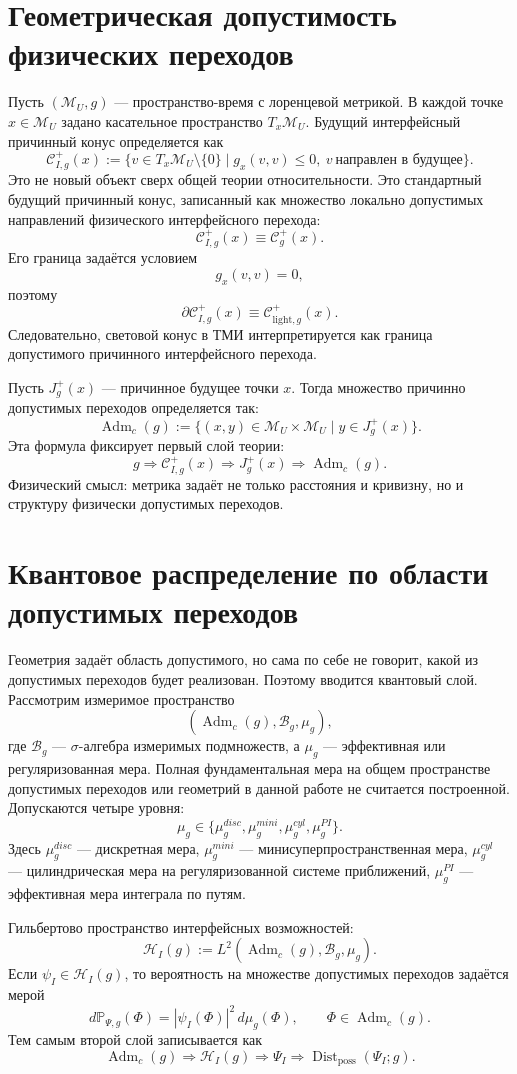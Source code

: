 \documentclass[12pt,a4paper]{article}
\DeclareMathOperator{\Adm}{Adm}
\DeclareMathOperator{\Dist}{Dist}
\newcommand{\M}{\mathcal M_U}
\newcommand{\Hilb}{\mathcal H}
\newcommand{\Prob}{\mathbb P}
\begin{document}
\section{Геометрическая допустимость физических переходов}
Пусть $(\M,g)$ — пространство-время с лоренцевой метрикой. В каждой точке $x\in\M$ задано касательное пространство $T_x\M$. Будущий интерфейсный причинный конус определяется как
\[
\boxed{
\mathcal C^{+}_{I,g}(x):=
\{v\in T_x\M\setminus\{0\}\mid g_x(v,v)\leq0,\ v\ \text{направлен в будущее}\}.
}
\]
Это не новый объект сверх общей теории относительности. Это стандартный будущий причинный конус, записанный как множество локально допустимых направлений физического интерфейсного перехода:
\[
\boxed{\mathcal C^{+}_{I,g}(x)\equiv\mathcal C^{+}_{g}(x).}
\]
Его граница задаётся условием
\[
 g_x(v,v)=0,
\]
поэтому
\[
\boxed{\partial\mathcal C^{+}_{I,g}(x)\equiv\mathcal C^{+}_{\mathrm{light},g}(x).}
\]
Следовательно, световой конус в ТМИ интерпретируется как граница допустимого причинного интерфейсного перехода.

Пусть $J_g^+(x)$ — причинное будущее точки $x$. Тогда множество причинно допустимых переходов определяется так:
\[
\boxed{
\Adm_c(g):=\{(x,y)\in\M\times\M\mid y\in J_g^+(x)\}.
}
\]
Эта формула фиксирует первый слой теории:
\[
\boxed{g\Rightarrow\mathcal C^+_{I,g}(x)\Rightarrow J_g^+(x)\Rightarrow\Adm_c(g).}
\]
Физический смысл: метрика задаёт не только расстояния и кривизну, но и структуру физически допустимых переходов.

\section{Квантовое распределение по области допустимых переходов}
Геометрия задаёт область допустимого, но сама по себе не говорит, какой из допустимых переходов будет реализован. Поэтому вводится квантовый слой. Рассмотрим измеримое пространство
\[
(\Adm_c(g),\mathcal B_g,\mu_g),
\]
где $\mathcal B_g$ — $\sigma$-алгебра измеримых подмножеств, а $\mu_g$ — эффективная или регуляризованная мера. Полная фундаментальная мера на общем пространстве допустимых переходов или геометрий в данной работе не считается построенной. Допускаются четыре уровня:
\[
\boxed{\mu_g\in\{\mu_g^{disc},\mu_g^{mini},\mu_g^{cyl},\mu_g^{PI}\}.}
\]
Здесь $\mu_g^{disc}$ — дискретная мера, $\mu_g^{mini}$ — минисуперпространственная мера, $\mu_g^{cyl}$ — цилиндрическая мера на регуляризованной системе приближений, $\mu_g^{PI}$ — эффективная мера интеграла по путям.

Гильбертово пространство интерфейсных возможностей:
\[
\boxed{
\Hilb_I(g):=L^2(\Adm_c(g),\mathcal B_g,\mu_g).
}
\]
Если $\psi_I\in\Hilb_I(g)$, то вероятность на множестве допустимых переходов задаётся мерой
\[
\boxed{
 d\Prob_{\Psi,g}(\Phi)=|\psi_I(\Phi)|^2\,d\mu_g(\Phi),\qquad \Phi\in\Adm_c(g).
}
\]
Тем самым второй слой записывается как
\[
\boxed{\Adm_c(g)\Rightarrow\Hilb_I(g)\Rightarrow\Psi_I\Rightarrow\Dist_{\mathrm{poss}}(\Psi_I;g).}
\]
\end{document}
